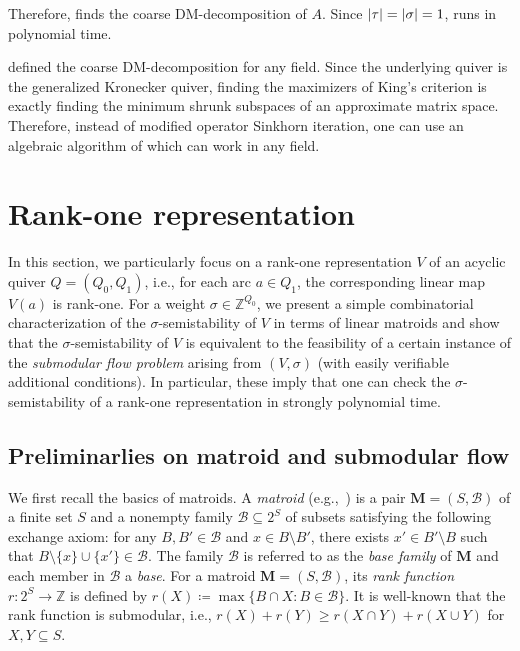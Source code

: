 \documentclass[a4paper,11pt]{article}
\numberwithin{equation}{section}
\newcommand{\Z}{\mathbb{Z}}
\newcommand{\M}{\mathbf{M}}
\DeclarePairedDelimiter{\abs}{\lvert}{\rvert}
\begin{document}
Therefore,  finds the coarse DM-decomposition of $A$.
Since $\abs{\tau} = \abs{\sigma} = 1$,  runs in polynomial time.

\begin{remark}
    \cite{Hirai2024} defined the coarse DM-decomposition for any field.
    Since the underlying quiver is the generalized Kronecker quiver, finding the maximizers of King's criterion is exactly finding the minimum shrunk subspaces of an approximate matrix space.
    Therefore, instead of modified operator Sinkhorn iteration, one can use an algebraic algorithm of \cite{Ivanyos2018} which can work in any field.
\end{remark}





\section{Rank-one representation}\label{sec:rank-one}
In this section, we particularly focus on a rank-one representation $V$ of an acyclic quiver $Q = (Q_0, Q_1)$, i.e.,
for each arc $a \in Q_1$, the corresponding linear map $V(a)$ is rank-one.
For a weight $\sigma \in \Z^{Q_0}$,
we present a simple combinatorial characterization of the $\sigma$-semistability of $V$ in terms of linear matroids
and show that
the $\sigma$-semistability of $V$ is equivalent to
the feasibility of a certain instance of the \emph{submodular flow problem} arising from $(V, \sigma)$
(with easily verifiable additional conditions).
In particular, these imply that one can check the $\sigma$-semistability of a rank-one representation in strongly polynomial time.



\subsection{Preliminarlies on matroid and submodular flow}
We first recall the basics of matroids.
A \emph{matroid} (e.g.,~\cite{Oxley2011}) is a pair $\M = (S, \mathcal{B})$ of a finite set $S$ and a nonempty family $\mathcal{B} \subseteq 2^S$ of subsets satisfying the following exchange axiom: for any $B, B' \in \mathcal{B}$ and $x \in B \setminus B'$,
there exists $x' \in B' \setminus B$ such that $B \setminus \{x\} \cup \{x'\} \in \mathcal{B}$.
The family $\mathcal{B}$ is referred to as the \emph{base family} of $\M$
and each member in $\mathcal{B}$ a \emph{base}.
For a matroid $\M = (S, \mathcal{B})$,
its \emph{rank function} $r : 2^S \to \Z$ is defined by $r(X) \coloneqq \max \{ B \cap X : B \in \mathcal{B} \}$.
It is well-known that the rank function is submodular, i.e.,
$r(X) + r(Y) \geq r(X \cap Y) + r(X \cup Y)$ for $X, Y \subseteq S$.
\end{document}
